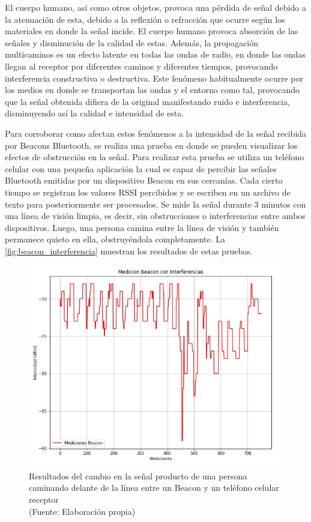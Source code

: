El cuerpo humano, así como otros objetos, provoca una pérdida de señal debido a la atenuación de esta, debido a la reflexión o refracción que ocurre según los materiales en donde la señal incide. El cuerpo humano provoca absorción de las señales y disminución de la calidad de estas. Además, la propagación multicaminos es un efecto latente en todas las ondas de radio, en donde las ondas llegan al receptor por diferentes caminos y diferentes tiempos, provocando interferencia constructiva o destructiva. Este fenómeno habitualmente ocurre por los medios en donde se transportan las ondas y el entorno como tal, provocando que la señal obtenida difiera de la original manifestando ruido e interferencia, disminuyendo así la calidad e intensidad de esta.

Para corroborar como afectan estos fenómenos a la intensidad de la señal recibida por Beacons Bluetooth, se realiza una prueba en donde se pueden visualizar los efectos de obstrucción en la señal. Para realizar esta prueba se utiliza un teléfono celular con una pequeña aplicación la cual es capaz de percibir las señales Bluetooth emitidas por un dispositivo Beacon en sus cercanías. Cada cierto tiempo se registran los valores RSSI percibidos y se escriben en un archivo de texto para posteriormente ser procesados. Se mide la señal durante 3 minutos con una línea de visión limpia, es decir, sin obstrucciones o interferencias entre ambos dispositivos. Luego, una persona camina entre la línea de visión y también permanece quieto en ella, obstruyéndola completamente. La \autoref{fig:beacon_interferencia} muestran los resultados de estas pruebas.

\begin{figure}[ht!]
\centering
\includegraphics[width=.6\textwidth]{figures/mediciones_beacon_interferencia.jpg}
\caption[Estabilidad de la señal Bluetooth]{Resultados del cambio en la señal producto de una persona caminando delante de la línea entre un Beacon y un teléfono celular receptor\\
{\scriptsize (Fuente: Elaboración propia)}}
\label{fig:beacon_interferencia}
\end{figure}

